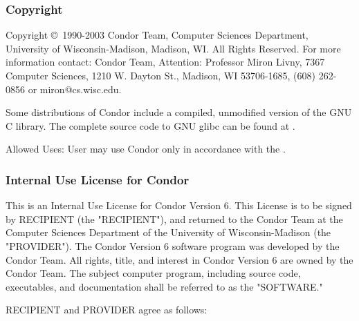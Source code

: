 \subsubsection*{\label{sec:copyright-and-disclaimer}Copyright}

Copyright \copyright\ 1990-2003 Condor Team, Computer Sciences Department,
University of Wisconsin-Madison, Madison, WI. All Rights Reserved.  For
more information contact: Condor Team, Attention: Professor Miron Livny,
7367 Computer Sciences, 1210 W. Dayton St., Madison, WI 53706-1685, (608)
262-0856 or miron@cs.wisc.edu. 

Some distributions of Condor include a compiled, unmodified version of 
the GNU C library.  The complete source code to GNU glibc can be 
found at .

Allowed Uses: User may use Condor only in accordance with the
.


\subsubsection*{\label{Internal-Use-License}Internal Use License for Condor}

This is an Internal Use License for Condor Version 6.  This License is
to be signed by RECIPIENT (the "RECIPIENT"), and returned to the
Condor Team at the Computer Sciences Department of the University of
Wisconsin-Madison (the "PROVIDER").  The Condor Version 6 software
program was developed by the Condor Team.  All rights, title, and
interest in Condor Version 6 are owned by the Condor Team.  The
subject computer program, including source code, executables, and
documentation shall be referred to as the "SOFTWARE."

RECIPIENT and PROVIDER agree as follows:

